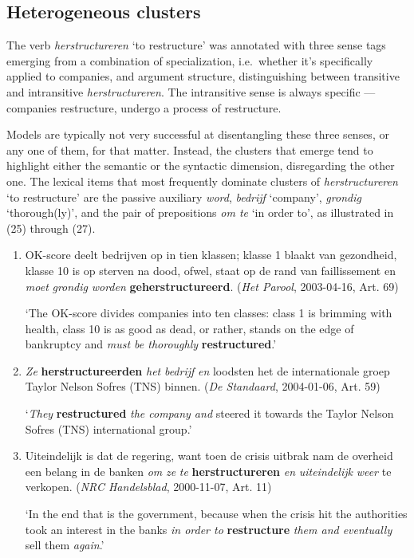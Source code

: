 \documentclass[
]{book}
\begin{document}
\hypertarget{heterogeneous-clusters}{%
\subsection{Heterogeneous clusters}\label{heterogeneous-clusters}}

The verb \emph{herstructureren} `to restructure' was annotated with three sense tags emerging from a combination of specialization, i.e.~whether it's specifically applied to companies, and argument structure, distinguishing between transitive and intransitive \emph{herstructureren}. The intransitive sense is always specific --- companies restructure, undergo a process of restructure.

Models are typically not very successful at disentangling these three senses, or any one of them, for that matter. Instead, the clusters that emerge tend to highlight either the semantic or the syntactic dimension, disregarding the other one.
The lexical items that most frequently dominate clusters of \emph{herstructureren} `to restructure' are the passive auxiliary \emph{word}, \emph{bedrijf} `company', \emph{grondig} `thorough(ly)', and the pair of prepositions \emph{om te} `in order to', as illustrated in (25) through (27).

\begin{enumerate}
\def\labelenumi{(\arabic{enumi})}
\setcounter{enumi}{24}
\item
  OK-score deelt bedrijven op in tien klassen; klasse 1 blaakt van gezondheid, klasse 10 is op sterven na dood, ofwel, staat op de rand van faillissement en \emph{moet} \emph{grondig} \emph{worden} \textbf{geherstructureerd}. (\emph{Het Parool}, 2003-04-16, Art. 69)

  `The OK-score divides companies into ten classes: class 1 is brimming with health, class 10 is as good as dead, or rather, stands on the edge of bankruptcy and \emph{must be thoroughly} \textbf{restructured}.'
\item
  \emph{Ze} \textbf{herstructureerden} \emph{het} \emph{bedrijf} \emph{en} loodsten het de internationale groep Taylor Nelson Sofres (TNS) binnen. (\emph{De Standaard}, 2004-01-06, Art. 59)

  `\emph{They} \textbf{restructured} \emph{the company and} steered it towards the Taylor Nelson Sofres (TNS) international group.'
\item
  Uiteindelijk is dat de regering, want toen de crisis uitbrak nam de overheid een belang in de banken \emph{om} \emph{ze} \emph{te} \textbf{herstructureren} \emph{en} \emph{uiteindelijk} \emph{weer} te verkopen. (\emph{NRC Handelsblad}, 2000-11-07, Art. 11)

  `In the end that is the government, because when the crisis hit the authorities took an interest in the banks \emph{in order to} \textbf{restructure} \emph{them and eventually} sell them \emph{again}.'
\end{enumerate}
\end{document}
